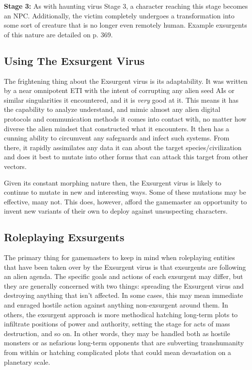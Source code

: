 \textbf{Stage 3:} As with haunting virus Stage 3, a character 
reaching this stage becomes an NPC. Additionally, 
the victim completely undergoes a transformation 
into some sort of creature that is no longer even remotely
human. Example exsurgents of this nature are
detailed on p. 369.

\subsection{Using The Exsurgent Virus}

The frightening thing about the Exsurgent virus is 
its adaptability. It was written by a near omnipotent 
ETI with the intent of corrupting any alien seed AIs 
or similar singularities it encountered, and it is \textit{very}
good at it. This means it has the capability to analyze
understand, and mimic almost any alien digital
protocols and communication methods it comes into 
contact with, no matter how diverse the alien mindset 
that constructed what it encounters. It then has a cunning
ability to circumvent any safeguards and infect
such systems. From there, it rapidly assimilates any 
data it can about the target species/civilization and 
does it best to mutate into other forms that can attack 
this target from other vectors. 

Given its constant morphing nature then, the Exsurgent
virus is likely to continue to mutate in new
and interesting ways. Some of these mutations may 
be effective, many not. This does, however, afford the 
gamemaster an opportunity to invent new variants of 
their own to deploy against unsuspecting characters.

\subsection{Roleplaying Exsurgents}

The primary thing for gamemasters to keep in mind 
when roleplaying entities that have been taken over 
by the Exsurgent virus is that exsurgents are following
an alien agenda. The specific goals and actions of
each exsurgent may differ, but they are generally concerned
with two things: spreading the Exsurgent virus
and destroying anything that isn't affected. In some 
cases, this may mean immediate and enraged hostile 
action against anything non-exsurgent around them. 
In others, the exsurgent approach is more methodical
hatching long-term plots to infiltrate positions of
power and authority, setting the stage for acts of mass 
destruction, and so on. In other words, they may be 
handled both as hostile monsters or as nefarious long-term
opponents that are subverting transhumanity
from within or hatching complicated plots that could 
mean devastation on a planetary scale.

